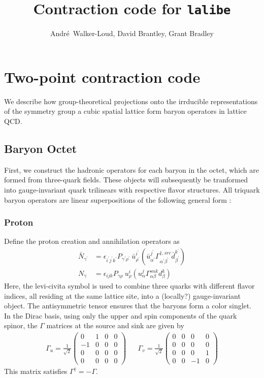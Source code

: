 \documentclass[prd,12pt,superscriptaddress,tightenlines,nofootinbib]{revtex4}
\def\a{{\alpha}}
\def\b{{\beta}}
\def\g{{\gamma}}
\def\G{{\Gamma}}
\def\ip{{i^\prime}}
\def\jp{{j^\prime}}
\def\kp{{k^\prime}}
\def\ap{{\alpha^\prime}}
\def\bp{{\beta^\prime}}
\def\gp{{\gamma^\prime}}
\def\rp{{\rho^\prime}}
\begin{document}
\title{Contraction code for \texttt{lalibe}}

\author{Andr\'{e}~Walker-Loud, David Brantley, Grant Bradley}


\maketitle

\section{Two-point contraction code}
We describe how group-theoretical projections onto 
the irrducible representations of the symmetry group a cubic spatial lattice form baryon operators in lattice QCD. 


\subsection{Baryon Octet}
First, we construct the hadronic operators for each baryon in the octet, which are formed from three-quark fields. These objects will subsequently be tranformed into gauge-invariant quark trilinears with respective flavor structures. All triquark baryon operators are
linear superpositions of the following general form :



\subsubsection{Proton}

Define the proton creation and annihilation operators as
\begin{align}
\bar{N}_{\gp} &= \epsilon_{\ip\jp\kp} P_{\gp\rp}\ \bar{u}^\ip_\rp (\bar{u}^{\jp}_{\ap} \G^{\dagger,src}_{\ap\bp} \bar{d}^\kp_\bp ) 
\\
N_{\g} &= \epsilon_{ijk} P_{\g\rho}\ u^i_\rho (u^j_\a \G^{snk}_{\a\b} d^k_\b ) 
\end{align}
Here, the levi-civita symbol is used to combine three quarks with different flavor indices, all residing 
at the same lattice site, into a (locally?) gauge-invariant object. The antisymmetric tensor ensures that the baryons 
form a color singlet. 
In the Dirac basis, using only the upper and spin components of the quark spinor, the $\G$ matrices at the source and sink are given by
\begin{align}
\G_{u} = \frac{1}{\sqrt{2}}\begin{pmatrix}
	0& 1& 0& 0\\
	-1& 0& 0& 0\\
	0& 0& 0& 0\\
	0& 0& 0& 0
	\end{pmatrix} && \G_{v} =  \frac{1}{\sqrt{2}}\begin{pmatrix}
	0& 0& 0& 0\\
	0& 0& 0& 0\\
	0& 0& 0& 1\\
	0& 0& -1& 0
	\end{pmatrix}
\end{align}
This matrix satisfies $\G^\dagger = -\G$.
\end{document}

